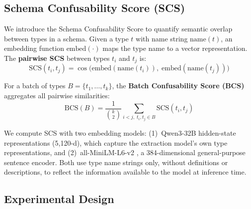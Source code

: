 \begin{table}[t]
\centering
\small
{}
\caption{Dataset statistics. BCS Range indicates the min--max Batch Confusability Scores across count-curve batches (Experiment~1). Embedding column indicates the model used for SCS/BCS computation. $^\dagger$Trigger mentions across 8{,}042 sentences in 710 documents.}
\label{tab:datasets}
\end{table}

\subsection{Schema Confusability Score (SCS)}
\label{sec:scs}

We introduce the Schema Confusability Score to quantify semantic overlap between types in a schema. Given a type $t$ with name string $\text{name}(t)$, an embedding function $\text{embed}(\cdot)$ maps the type name to a vector representation. The \textbf{pairwise SCS} between types $t_i$ and $t_j$ is:
\[
\text{SCS}(t_i, t_j) = \cos\bigl(\text{embed}(\text{name}(t_i)),\; \text{embed}(\text{name}(t_j))\bigr)
\]

For a batch of types $B = \{t_1, \ldots, t_k\}$, the \textbf{Batch Confusability Score (BCS)} aggregates all pairwise similarities:
\[
\text{BCS}(B) = \frac{1}{\binom{k}{2}} \sum_{i < j,\; t_i, t_j \in B} \text{SCS}(t_i, t_j)
\]

We compute SCS with two embedding models: (1)~Qwen3-32B \cite{qwen3-2025} hidden-state representations (5{,}120-d), which capture the extraction model's own type representations, and (2)~all-MiniLM-L6-v2 \cite{minilm-2019}, a 384-dimensional general-purpose sentence encoder. Both use type name strings only, without definitions or descriptions, to reflect the information available to the model at inference time.

\subsection{Experimental Design}
\label{sec:exp_design}

